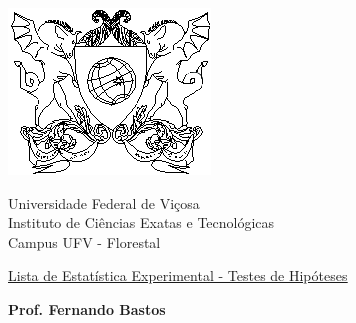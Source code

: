 \documentclass{report}
\begin{document}
\vspace*{-2cm}

\begin{center}
\begin{minipage}[s]{2cm}
\hspace{-1.3cm}\includegraphics[scale=1.0]{Figuras/brasaoufv.eps}
\end{minipage}
\begin{minipage}[s]{13cm}
{\begin{center} {\sc \Large Universidade Federal de Vi\c{c}osa}\\
{\sc \large Instituto de Ci\^encias Exatas e Tecnológicas}\\
{\sc \large Campus UFV - Florestal}\\
\end{center}}
\end{minipage}\begin{minipage}[s]{2 cm}
\end{minipage}
\end{center}

\vspace{-0.3cm}



\medskip

\begin{center}

\underline{\underline{{\large{\sc Lista de Estatística Experimental - Testes de Hipóteses}}}}

\bigskip

{\large {\bf Prof. Fernando Bastos}}
%
\end{center}
\end{document}
